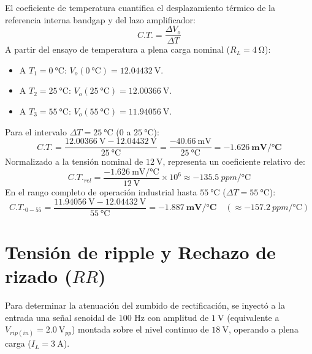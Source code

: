 El coeficiente de temperatura cuantifica el desplazamiento térmico de la referencia interna bandgap y del lazo
amplificador:
\begin{equation*}
    C.T. = \frac{\Delta V_o}{\Delta T}
\end{equation*}
A partir del ensayo de temperatura a plena carga nominal ($R_L = \SI{4}{\ohm}$):
\begin{itemize}
    \item A $T_1 = \SI{0}{\celsius}$: $V_o(\SI{0}{\celsius}) = \SI{12.04432}{\volt}$.
    \item A $T_2 = \SI{25}{\celsius}$: $V_o(\SI{25}{\celsius}) = \SI{12.00366}{\volt}$.
    \item A $T_3 = \SI{55}{\celsius}$: $V_o(\SI{55}{\celsius}) = \SI{11.94056}{\volt}$.
\end{itemize}
Para el intervalo $\Delta T = \SI{25}{\celsius}$ ($0$ a $\SI{25}{\celsius}$):
\begin{equation*}
    C.T. = \frac{\SI{12.00366}{\volt} - \SI{12.04432}{\volt}}{\SI{25}{\celsius}}
         = \frac{\SI{-40.66}{\milli\volt}}{\SI{25}{\celsius}}
         = \mathbf{\SI{-1.626}{\milli\volt/\celsius}}
\end{equation*}
Normalizado a la tensión nominal de $\SI{12}{\volt}$, representa un coeficiente relativo de:
\begin{equation*}
    C.T._{rel} = \frac{\SI{-1.626}{\milli\volt/\celsius}}{\SI{12}{\volt}} \times 10^6 \approx \SI{-135.5}{ppm/\celsius}
\end{equation*}
En el rango completo de operación industrial hasta $\SI{55}{\celsius}$ ($\Delta T = \SI{55}{\celsius}$):
\begin{equation*}
    C.T._{0-55} = \frac{\SI{11.94056}{\volt} - \SI{12.04432}{\volt}}{\SI{55}{\celsius}}
                = \mathbf{\SI{-1.887}{\milli\volt/\celsius}}
                \quad (\approx \SI{-157.2}{ppm/\celsius})
\end{equation*}

\section{Tensión de ripple y Rechazo de rizado ($RR$)}
\label{sec.c5:ripple}

Para determinar la atenuación del zumbido de rectificación, se inyectó a la entrada una señal senoidal de
$100\text{ Hz}$ con amplitud de $\SI{1}{\volt}$ (equivalente a $V_{rip(in)} = \SI{2.0}{\volt_{pp}}$) montada sobre el nivel
continuo de $\SI{18}{\volt}$, operando a plena carga ($I_L = \SI{3}{\ampere}$).

